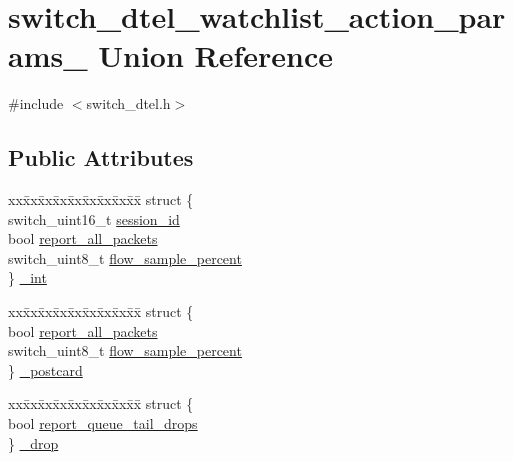 \hypertarget{unionswitch__dtel__watchlist__action__params__}{\section{switch\+\_\+dtel\+\_\+watchlist\+\_\+action\+\_\+params\+\_\+ Union Reference}
\label{unionswitch__dtel__watchlist__action__params__}
}


{\ttfamily \#include $<$switch\+\_\+dtel.\+h$>$}

\subsection*{Public Attributes}
\begin{DoxyCompactItemize}
\item 
\begin{tabbing}
xx\=xx\=xx\=xx\=xx\=xx\=xx\=xx\=xx\=\kill
struct \{\\
\>switch\_uint16\_t \hyperlink{unionswitch__dtel__watchlist__action__params___a75472186ef19bd1b1d84ab8edf09363b}{session\_id}\\
\>bool \hyperlink{unionswitch__dtel__watchlist__action__params___a1f91e1d1c7808b9c4a45ee640d7308cf}{report\_all\_packets}\\
\>switch\_uint8\_t \hyperlink{unionswitch__dtel__watchlist__action__params___a45fc8fdda9f8de9cdc3694d1f47f2137}{flow\_sample\_percent}\\
\} \hyperlink{unionswitch__dtel__watchlist__action__params___a36b810b8147ed34b920998b3d3aebc44}{\_int}\\

\end{tabbing}\item 
\begin{tabbing}
xx\=xx\=xx\=xx\=xx\=xx\=xx\=xx\=xx\=\kill
struct \{\\
\>bool \hyperlink{unionswitch__dtel__watchlist__action__params___a1f91e1d1c7808b9c4a45ee640d7308cf}{report\_all\_packets}\\
\>switch\_uint8\_t \hyperlink{unionswitch__dtel__watchlist__action__params___a45fc8fdda9f8de9cdc3694d1f47f2137}{flow\_sample\_percent}\\
\} \hyperlink{unionswitch__dtel__watchlist__action__params___aa8e51d31eefa8b4ed93c52ecf453f4e0}{\_postcard}\\

\end{tabbing}\item 
\begin{tabbing}
xx\=xx\=xx\=xx\=xx\=xx\=xx\=xx\=xx\=\kill
struct \{\\
\>bool \hyperlink{unionswitch__dtel__watchlist__action__params___aee571eee0b3f8b84fe58761df414498e}{report\_queue\_tail\_drops}\\
\} \hyperlink{unionswitch__dtel__watchlist__action__params___aafb5463af915c31ae4b55a204600eefb}{\_drop}\\

\end{tabbing}\end{DoxyCompactItemize}



